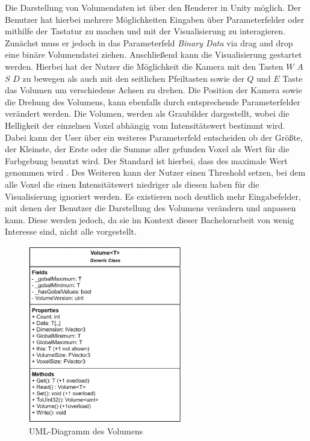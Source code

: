 Die Darstellung von Volumendaten ist über den Renderer in Unity möglich. Der Benutzer hat hierbei mehrere Möglichkeiten Eingaben über Parameterfelder oder mithilfe der Tastatur zu machen und mit der Visualisierung zu interagieren. Zunächst muss er jedoch in das Parameterfeld \textit{Binary Data} via drag and drop eine binäre Volumendatei ziehen.
\newline
Anschließend kann die Visualisierung gestartet werden. Hierbei hat der Nutzer die Möglichkeit die Kamera mit den Tasten $W$ $A$ $S$ $D$ zu bewegen als auch mit den seitlichen Pfeiltasten sowie der $Q$ und $E$ Taste das Volumen um verschiedene Achsen zu drehen. Die Position der Kamera sowie die Drehung des Volumens, kann ebenfalls durch entsprechende Parameterfelder verändert werden.
\newline
Die Volumen, werden als Graubilder dargestellt, wobei die Helligkeit der einzelnen Voxel abhängig vom Intensitätswert bestimmt wird. Dabei kann der User über ein weiteres Parameterfeld entscheiden ob der Größte, der Kleinste, der Erste oder die Summe aller gefunden Voxel als Wert für die Farbgebung benutzt wird. Der Standard ist hierbei, dass des maximale Wert genommen wird .
\newline
Des Weiteren kann der Nutzer einen Threshold setzen, bei dem alle Voxel die einen Intensitätswert niedriger als diesen haben für die Visualisierung ignoriert werden.
\newline
Es existieren noch deutlich mehr Eingabefelder, mit denen der Benutzer die Darstellung des Volumens verändern und anpassen kann. Diese werden jedoch, da sie im Kontext dieser Bachelorarbeit von wenig Interesse sind, nicht alle vorgestellt.


\begin{figure}
\centering
\includegraphics[width=0.6\textwidth]{Logos/Volume_UML.PNG}
\caption{UML-Diagramm des Volumens} 
\label{fig:volume_uml} 
\end{figure}


